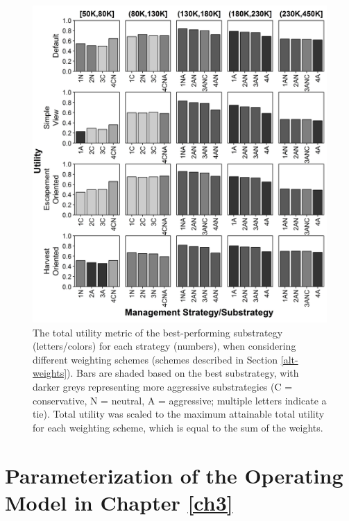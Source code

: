 \documentclass[12pt,]{book}
\theoremstyle{definition}
\theoremstyle{definition}
\theoremstyle{definition}
\theoremstyle{remark}
\begin{document}
\begin{singlespace}
\begin{figure}
  \centering
  \includegraphics{img/Ch3/btwn-ms-weights.jpg}
  \caption{The total utility metric of the best-performing substrategy (letters/colors) for each strategy (numbers), when considering different weighting schemes (schemes described in Section \ref{alt-weights}). Bars are shaded based on the best substrategy, with darker greys representing more aggressive substrategies (C = conservative, N = neutral, A = aggressive; multiple letters indicate a tie). Total utility was scaled to the maximum attainable total utility for each weighting scheme, which is equal to the sum of the weights.}
  \label{fig:btwn-ms-weights}
\end{figure}

\end{singlespace}

\setlength{\parskip}{6pt plus 2pt minus 1pt}

\appendix


\captionsetup[figure]{list=yes} \captionsetup[table]{list=yes}

\chapter{Parameterization of the Operating Model in Chapter
\ref{ch3}}\label{appendix-a}
\end{document}
